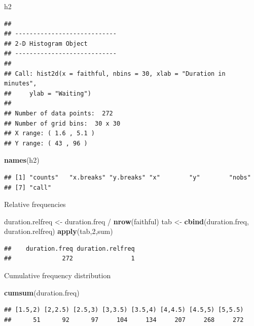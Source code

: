 \documentclass[]{article}
\newenvironment{Shaded}{\begin{snugshade}}{\end{snugshade}}
\newcommand{\KeywordTok}[1]{\textcolor[rgb]{0.13,0.29,0.53}{\textbf{{#1}}}}
\newcommand{\DecValTok}[1]{\textcolor[rgb]{0.00,0.00,0.81}{{#1}}}
\newcommand{\StringTok}[1]{\textcolor[rgb]{0.31,0.60,0.02}{{#1}}}
\newcommand{\NormalTok}[1]{{#1}}
\numberwithin{equation}{section}
\begin{document}
\begin{Shaded}
\begin{Highlighting}[]
\NormalTok{h2}
\end{Highlighting}
\end{Shaded}

\begin{verbatim}
## 
## ----------------------------
## 2-D Histogram Object
## ----------------------------
## 
## Call: hist2d(x = faithful, nbins = 30, xlab = "Duration in minutes", 
##     ylab = "Waiting")
## 
## Number of data points:  272 
## Number of grid bins:  30 x 30 
## X range: ( 1.6 , 5.1 )
## Y range: ( 43 , 96 )
\end{verbatim}

\begin{Shaded}
\begin{Highlighting}[]
\KeywordTok{names}\NormalTok{(h2)}
\end{Highlighting}
\end{Shaded}

\begin{verbatim}
## [1] "counts"   "x.breaks" "y.breaks" "x"        "y"        "nobs"    
## [7] "call"
\end{verbatim}

Relative frequencies

\begin{Shaded}
\begin{Highlighting}[]
\NormalTok{duration.relfreq <-}\StringTok{ }\NormalTok{duration.freq /}\StringTok{ }\KeywordTok{nrow}\NormalTok{(faithful) }
\NormalTok{tab <-}\StringTok{ }\KeywordTok{cbind}\NormalTok{(duration.freq, duration.relfreq) }
\KeywordTok{apply}\NormalTok{(tab,}\DecValTok{2}\NormalTok{,sum)}
\end{Highlighting}
\end{Shaded}

\begin{verbatim}
##    duration.freq duration.relfreq 
##              272                1
\end{verbatim}

Cumulative frequency distribution

\begin{Shaded}
\begin{Highlighting}[]
\KeywordTok{cumsum}\NormalTok{(duration.freq)}
\end{Highlighting}
\end{Shaded}

\begin{verbatim}
## [1.5,2) [2,2.5) [2.5,3) [3,3.5) [3.5,4) [4,4.5) [4.5,5) [5,5.5) 
##      51      92      97     104     134     207     268     272
\end{verbatim}
\end{document}
